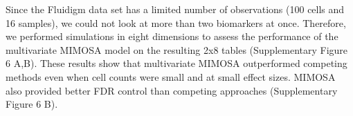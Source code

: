 \documentclass[12pt,oupdraft]{biostatistics}
\begin{document}
%

Since the Fluidigm data set has a limited number of observations (100 cells and 16 samples), we could not look at more than two biomarkers at once. Therefore, we performed simulations in eight dimensions to assess the performance of the multivariate MIMOSA  model on the resulting 2x8 tables (Supplementary Figure 6 A,B). These results show that multivariate MIMOSA outperformed competing methods even when cell counts were small and at small effect sizes. MIMOSA also provided better FDR control than competing approaches (Supplementary Figure 6 B). 
\end{document}
